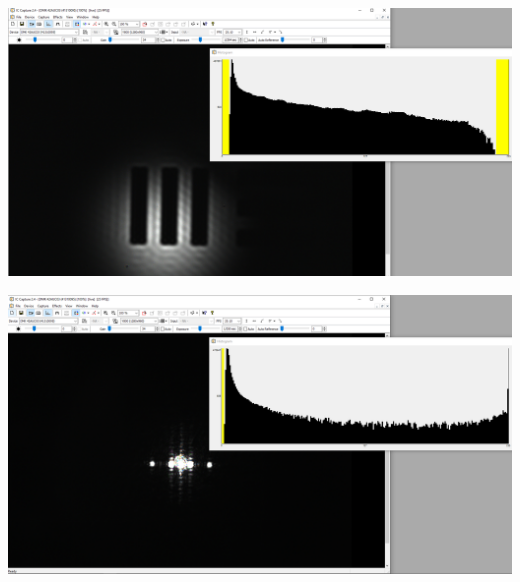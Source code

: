 \documentclass[11pt,ngerman]{scrartcl}
\begin{document}
\begin{minipage}{\textwidth}
	\begin{minipage}[t]{0.5\textwidth}
		\centering
		\includegraphics[width=\textwidth]{abbe/objekt3ordnungen}
		\label{fig:bild3}
	\end{minipage}
	\vspace{2mm}
	\begin{minipage}[t]{0.50\textwidth}
		\centering
		\includegraphics[width=\textwidth]{abbe/beugungsbild3ordnungen}
		\label{fig:beugung3}
	\end{minipage}
	\vspace{1em}
\end{minipage}
\end{document}
